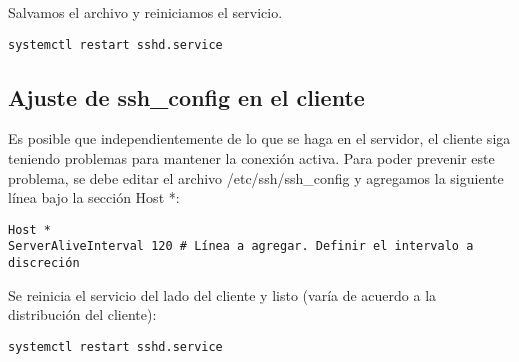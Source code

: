 Salvamos el archivo y reiniciamos el servicio.

\begin{lstlisting} 
systemctl restart sshd.service
\end{lstlisting}

\subsection{Ajuste de ssh\_config en el cliente}
Es posible que independientemente de lo que se haga en el servidor, el cliente siga teniendo problemas para mantener la conexión activa. Para poder prevenir este problema, se debe editar el archivo /etc/ssh/ssh\_config y agregamos la siguiente línea bajo la sección Host *:

\begin{lstlisting} 
Host *
ServerAliveInterval 120 # Línea a agregar. Definir el intervalo a discreción
\end{lstlisting}

Se reinicia el servicio del lado del cliente y listo (varía de acuerdo a la distribución del cliente):

\begin{lstlisting} 
systemctl restart sshd.service
\end{lstlisting}

\clearpage